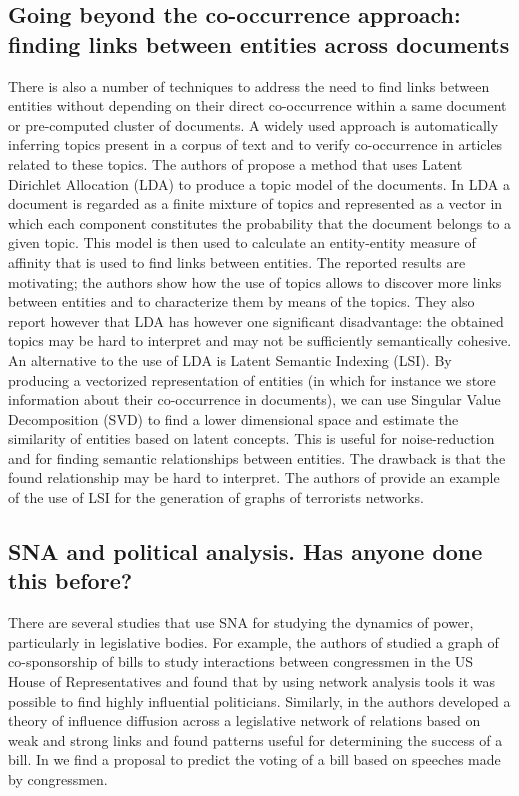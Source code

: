 \subsection{Going beyond the co-occurrence approach: finding links between entities across documents}\label{topics}

There is also a number of techniques to address the need to find links between entities without depending on their direct co-occurrence within a same document or pre-computed cluster of documents. A widely used approach is automatically inferring topics present in a corpus of text and to verify co-occurrence in articles related to these topics. The authors of  \cite{lda-topics-entities} propose a method that uses Latent Dirichlet Allocation (LDA) to produce a topic model of the documents. In LDA a document is regarded as a finite mixture of topics and represented as a vector in which each component constitutes the probability that the document belongs to a given topic. This model is then used to calculate an entity-entity measure of affinity that is used to find links between entities. The reported results are motivating; the authors show how the use of topics allows to discover more links between entities and to characterize them by means of the topics. They also report however that LDA has however one significant disadvantage: the obtained topics may be hard to interpret and may not be sufficiently semantically cohesive. \\

An alternative to the use of LDA is Latent Semantic Indexing (LSI). By producing a vectorized representation of entities (in which for instance we store information about their co-occurrence in documents), we can use Singular Value Decomposition (SVD) to find a lower dimensional space and estimate the similarity of entities based on latent concepts. This is useful for noise-reduction and for finding semantic relationships between entities. The drawback is that the found relationship may be hard to interpret. The authors of \cite{latent_semantic-index-terrorism} provide an example of the use of LSI for the generation of graphs of terrorists networks.\\

\subsection{SNA and political analysis. Has anyone done this before?}\label{sna-politics}

There are several studies that use SNA for studying the dynamics of power, particularly in legislative bodies. For example, the authors of \cite{fowler2006connecting} studied a graph of co-sponsorship of bills to study interactions between congressmen in the US House of Representatives and found that by using network analysis tools it was possible to find highly influential politicians. Similarly, in \cite{kirkland2011relational} the authors  developed a theory of influence diffusion across a legislative network of relations based on weak and strong links and found patterns useful for determining the success of a bill. In \cite{thomas2006get} we find a proposal to predict the voting of a bill based on speeches made by congressmen. \\

